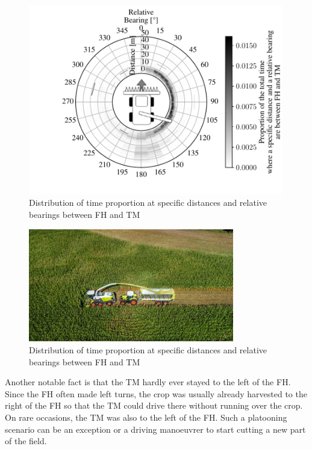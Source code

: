 \documentclass[]{nsm-thesis}
\begin{document}
\begin{figure}%
	\centering
	\includegraphics[width=0.99\textwidth]{figures/bearingHarvestScenario50.pdf}
	\caption{Distribution of time proportion at specific distances and relative bearings between \ac{FH} and \ac{TM}}%
	\label{fig:bearing}%
\end{figure}

\begin{figure}%
	\centering
	\includegraphics[width=0.8\textwidth]{figures/claas_harvest_behind.png}
	\caption{Distribution of time proportion at specific distances and relative bearings between \ac{FH} and \ac{TM}}%
	\label{fig:startpart}%
\end{figure}

Another notable fact is that the \ac{TM} hardly ever stayed to the left of the \ac{FH}. Since the \ac{FH} often made left turns, the crop was usually already harvested to the right of the \ac{FH} so that the \ac{TM} could drive there without running over the crop. On rare occasions, the \ac{TM} was also to the left of the \ac{FH}. Such a platooning scenario can be an exception or a driving manoeuvrer to start cutting a new part of the field.   
\end{document}
